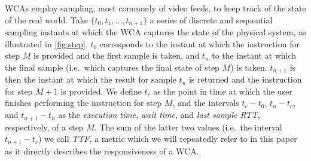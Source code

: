 \acp{WCA} employ sampling, most commonly of video feeds, to keep track of the state of the real world.
Take \( \{ t_0, t_1, \ldots, t_{n + 1} \} \) a series of discrete and sequential sampling instants at which the \ac{WCA} captures the state of the physical system, as illustrated in \cref{fig:step}.
\( t_0 \) corresponds to the instant at which the instruction for step \( M \) is provided and the first sample is taken, and \( t_n \) to the instant at which the final sample (i.e.\ which captures the final state of step \( M \)) is taken. 
\( t_{n + 1} \) is then the instant at which the result for sample \( t_n \) is returned and the instruction for step \( M + 1 \) is provided.
We define \( t_c \) as the point in time at which the user finishes performing the instruction for step \( M \), and the intervals \( t_c - t_0 \), \( t_n - t_c \), and \( t_{n + 1} - t_n \) as the \emph{execution time}, \emph{wait time}, and \emph{last sample \ac{RTT}}, respectively, of a step \( M \).
The sum of the latter two values (i.e.\ the interval \( t_{n + 1} - t_c \)) we call \emph{\ac{TTF}}, a metric which we will repeatedly refer to in this paper as it directly describes the responsiveness of a \ac{WCA}.


